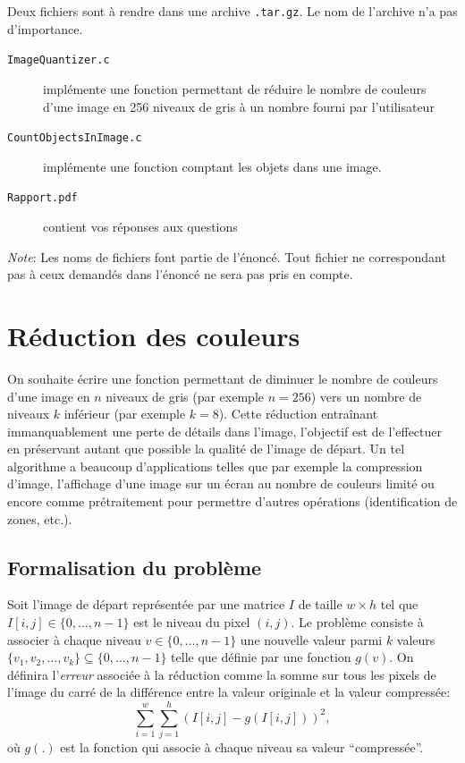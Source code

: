 \documentclass[a4paper,10pt]{article}
\begin{document}
Deux fichiers sont à rendre dans une archive \texttt{.tar.gz}. Le nom de l'archive n'a pas d'importance.
\begin{description}
\item[\texttt{ImageQuantizer.c}] implémente une fonction permettant de réduire le nombre de couleurs d'une image en 256 niveaux de gris à un nombre fourni par l'utilisateur
\item[\texttt{CountObjectsInImage.c}] implémente une fonction comptant les objets dans une image.
\item[\texttt{Rapport.pdf}] contient vos réponses aux questions
\end{description}

{\em Note}: Les noms de fichiers font partie de l'énoncé. Tout fichier ne
correspondant pas à ceux demandés dans l'énoncé ne sera pas pris en compte.

\section{Réduction des couleurs}

On souhaite écrire une fonction permettant de diminuer le nombre de
couleurs d'une image en $n$ niveaux de gris (par exemple $n=256$) vers
un nombre de niveaux $k$ inférieur (par exemple $k=8$). Cette
réduction entraînant immanquablement une perte de détails dans
l'image, l'objectif est de l'effectuer en préservant autant que
possible la qualité de l'image de départ. Un tel algorithme a beaucoup
d'applications telles que par exemple la compression d'image,
l'affichage d'une image sur un écran au nombre de couleurs limité ou
encore comme prétraitement pour permettre d'autres opérations
(identification de zones, etc.).

\subsection*{Formalisation du problème}

Soit l'image de départ représentée par une matrice $I$ de taille
$w\times h$ tel que $I[i,j]\in\{0,\ldots,n-1\}$ est le niveau du pixel
$(i,j)$. Le problème consiste à associer à chaque niveau $v\in
\{0,\ldots,n-1\}$ une nouvelle valeur parmi $k$ valeurs $\{v_1,
v_2,\ldots, v_k\} \subseteq \{0,\ldots, n-1\}$ telle que définie par une
fonction $g(v)$. On définira l'{\it erreur} associée à la réduction
comme la somme sur tous les pixels de l'image du carré de la
différence entre la valeur originale et la valeur compressée:
$$\sum_{i=1}^w\sum_{j=1}^h (I[i,j]-g(I[i,j]))^2,$$ où $g(.)$ est la
fonction qui associe à chaque niveau sa valeur ``compressée''.
\end{document}
